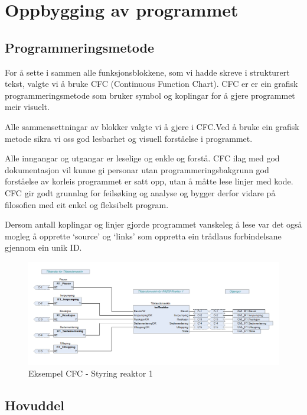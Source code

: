 \newpage
\section{Oppbygging av programmet}
\thispagestyle{fancy}

\subsection{Programmeringsmetode}
For å sette i sammen alle funksjonsblokkene, som vi hadde skreve i strukturert tekst, valgte vi å bruke  CFC (Continuous Function Chart).
CFC er er ein grafisk programmeringsmetode som bruker symbol og koplingar for å gjere programmet  meir visuelt.

Alle sammensettningar av blokker valgte vi å gjere i CFC.\@ Ved å bruke ein grafisk metode sikra vi oss god lesbarhet og
visuell forståelse i programmet. 

Alle inngangar og utgangar er leselige og enkle og forstå. CFC ilag med god dokumentasjon vil kunne gi personar utan programmeringsbakgrunn
god forståelse av korleis programmet er satt opp, utan å måtte lese linjer med kode.
CFC gir godt grunnlag for feilsøking og analyse og bygger derfor vidare på filosofien med eit enkel og fleksibelt program.

Dersom antall koplingar og linjer gjorde programmet vanskeleg å lese var det også
mogleg å opprette `source' og `links' som oppretta ein trådlaus forbindelsane gjennom ein unik ID.\@


\begin{figure}[htbp]
    \centering
    \includegraphics[width=1\textwidth]{Bilder/ReaktorPRG.png}
    \caption{Eksempel CFC - Styring reaktor 1}\label{fig:CFCReaktor}
\end{figure}

\newpage

\subsection{Hovuddel}

